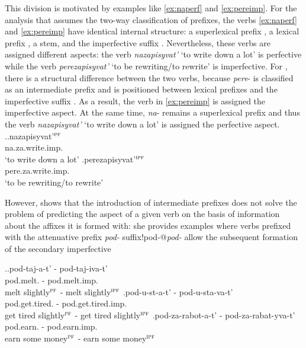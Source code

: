 This division is motivated by examples like \ref{ex:naperf} and \ref{ex:pereimp}. For the analysis that assumes the two-way classification of prefixes, the verbs \ref{ex:naperf} and \ref{ex:pereimp} have identical internal structure: a superlexical prefix , a lexical prefix , a stem, and the imperfective suffix  . Nevertheless, these verbs are assigned different aspects: the verb \textit{nazapisyvat'} `to write down a lot' is perfective while the verb \textit{perezapisyvat'} `to be rewriting/to rewrite' is imperfective. For \citet{Tatevosov:07}, there is a structural difference between the two verbs, because \textit{pere}- is classified as an intermediate prefix and is positioned between lexical prefixes  and the imperfective suffix  . As a result, the verb in \ref{ex:pereimp} is assigned the imperfective aspect. At the same time, \textit{na}- remains a superlexical prefix  and thus the verb \textit{nazapisyvat'} `to write down a lot' is assigned the perfective aspect.
\ex.\ag.\label{ex:naperf}nazapisyvat'$^{\textsc{pf}}$\\
na.za.write.imp.\\
`to write down a lot'
\bg.\label{ex:pereimp}perezapisyvat'$^{\textsc{ipf}}$\\
pere.za.write.imp.\\
`to be rewriting/to rewrite'

However, \cite{Kagan:book} shows that the introduction of intermediate prefixes  does not solve the problem of predicting the aspect of a given verb on the basis of information about the affixes it is formed with: she provides examples where verbs prefixed with the attenuative  prefix \textit{pod-}   {suffix!pod-@\textsl{pod-} }  allow the subsequent formation of the secondary imperfective  \citep[35, ex.~\ref{ex:pod} here]{Kagan:book}

\ex.\label{ex:pod}\ag.pod-taj-a-t' - pod-taj-iva-t'\\
pod.melt. - pod.melt.imp.\\
melt slightly$^{\textsc{pf}}$ - melt slightly$^{\textsc{ipf}}$
\bg.\label{ex:podustavat'}pod-u-st-a-t' - pod-u-sta-va-t'\\
pod.get.tired. - pod.get.tired.imp.\\
get tired slightly$^{\textsc{pf}}$ - get tired slightly$^{\textsc{ipf}}$
\bg.\label{ex:podzarabatyvat'}pod-za-rabot-a-t' - pod-za-rabat-yva-t'\\
pod.earn. - pod.earn.imp.\\
earn some money$^{\textsc{pf}}$ - earn some money$^{\textsc{ipf}}$

